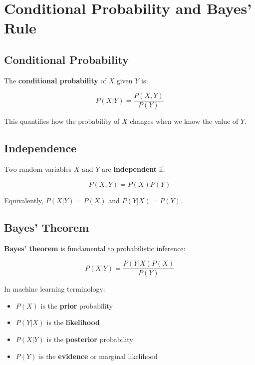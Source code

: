 
\section{Conditional Probability and Bayes' Rule}
\label{sec:conditional-probability}

\subsection{Conditional Probability}

The \textbf{conditional probability} of $X$ given $Y$ is:

\begin{equation}
P(X|Y) = \frac{P(X, Y)}{P(Y)}
\end{equation}

This quantifies how the probability of $X$ changes when we know the value of $Y$.

\subsection{Independence}

Two random variables $X$ and $Y$ are \textbf{independent} if:

\begin{equation}
P(X, Y) = P(X)P(Y)
\end{equation}

Equivalently, $P(X|Y) = P(X)$ and $P(Y|X) = P(Y)$.

\subsection{Bayes' Theorem}

\textbf{Bayes' theorem} is fundamental to probabilistic inference:

\begin{equation}
P(X|Y) = \frac{P(Y|X)P(X)}{P(Y)}
\end{equation}

In machine learning terminology:
\begin{itemize}
    \item $P(X)$ is the \textbf{prior} probability
    \item $P(Y|X)$ is the \textbf{likelihood}
    \item $P(X|Y)$ is the \textbf{posterior} probability
    \item $P(Y)$ is the \textbf{evidence} or marginal likelihood
\end{itemize}

